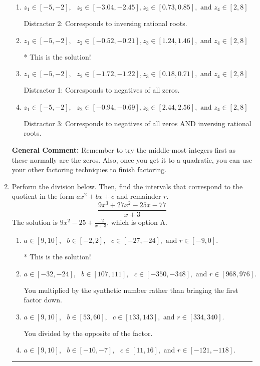\documentclass{extbook}[14pt]
\newcommand{\litem}[1]{\item #1

\rule{\textwidth}{0.4pt}}
\begin{document}
\begin{enumerate}
{\begin{enumerate}[label=\Alph*.]
 Distractor 4: Corresponds to moving factors from one rational to another.
\item \( z_1 \in [-5, -2], \text{   }  z_2 \in [-3.04, -2.45], z_3 \in [0.73, 0.85], \text{   and   } z_4 \in [2, 8] \)

 Distractor 2: Corresponds to inversing rational roots.
\item \( z_1 \in [-5, -2], \text{   }  z_2 \in [-0.52, -0.21], z_3 \in [1.24, 1.46], \text{   and   } z_4 \in [2, 8] \)

* This is the solution!
\item \( z_1 \in [-5, -2], \text{   }  z_2 \in [-1.72, -1.22], z_3 \in [0.18, 0.71], \text{   and   } z_4 \in [2, 8] \)

 Distractor 1: Corresponds to negatives of all zeros.
\item \( z_1 \in [-5, -2], \text{   }  z_2 \in [-0.94, -0.69], z_3 \in [2.44, 2.56], \text{   and   } z_4 \in [2, 8] \)

 Distractor 3: Corresponds to negatives of all zeros AND inversing rational roots.
\end{enumerate}

\textbf{General Comment:} Remember to try the middle-most integers first as these normally are the zeros. Also, once you get it to a quadratic, you can use your other factoring techniques to finish factoring.
}
\litem{
Perform the division below. Then, find the intervals that correspond to the quotient in the form $ax^2+bx+c$ and remainder $r$.
\[ \frac{9x^{3} +27 x^{2} -25 x -77}{x + 3} \]The solution is \( 9x^{2} -25 + \frac{-2}{x + 3} \), which is option A.\begin{enumerate}[label=\Alph*.]
\item \( a \in [9, 10], \text{   } b \in [-2, 2], \text{   } c \in [-27, -24], \text{   and   } r \in [-9, 0]. \)

* This is the solution!
\item \( a \in [-32, -24], \text{   } b \in [107, 111], \text{   } c \in [-350, -348], \text{   and   } r \in [968, 976]. \)

 You multiplied by the synthetic number rather than bringing the first factor down.
\item \( a \in [9, 10], \text{   } b \in [53, 60], \text{   } c \in [133, 143], \text{   and   } r \in [334, 340]. \)

 You divided by the opposite of the factor.
\item \( a \in [9, 10], \text{   } b \in [-10, -7], \text{   } c \in [11, 16], \text{   and   } r \in [-121, -118]. \)


\end{enumerate}}
\end{enumerate}
\end{document}
